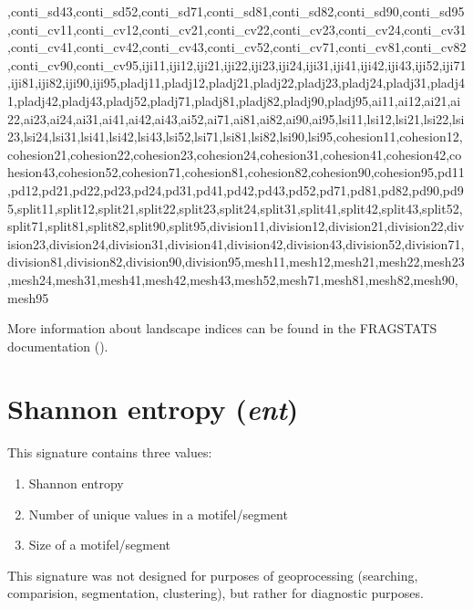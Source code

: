 ,conti_sd43,conti_sd52,conti_sd71,conti_sd81,conti_sd82,conti_sd90,conti_sd95,conti_cv11,conti_cv12,conti_cv21,conti_cv22,conti_cv23,conti_cv24,conti_cv31,conti_cv41,conti_cv42,conti_cv43,conti_cv52,conti_cv71,conti_cv81,conti_cv82,conti_cv90,conti_cv95,iji11,iji12,iji21,iji22,iji23,iji24,iji31,iji41,iji42,iji43,iji52,iji71,iji81,iji82,iji90,iji95,pladj11,pladj12,pladj21,pladj22,pladj23,pladj24,pladj31,pladj41,pladj42,pladj43,pladj52,pladj71,pladj81,pladj82,pladj90,pladj95,ai11,ai12,ai21,ai22,ai23,ai24,ai31,ai41,ai42,ai43,ai52,ai71,ai81,ai82,ai90,ai95,lsi11,lsi12,lsi21,lsi22,lsi23,lsi24,lsi31,lsi41,lsi42,lsi43,lsi52,lsi71,lsi81,lsi82,lsi90,lsi95,cohesion11,cohesion12,cohesion21,cohesion22,cohesion23,cohesion24,cohesion31,cohesion41,cohesion42,cohesion43,cohesion52,cohesion71,cohesion81,cohesion82,cohesion90,cohesion95,pd11,pd12,pd21,pd22,pd23,pd24,pd31,pd41,pd42,pd43,pd52,pd71,pd81,pd82,pd90,pd95,split11,split12,split21,split22,split23,split24,split31,split41,split42,split43,split52,split71,split81,split82,split90,split95,division11,division12,division21,division22,division23,division24,division31,division41,division42,division43,division52,division71,division81,division82,division90,division95,mesh11,mesh12,mesh21,mesh22,mesh23,mesh24,mesh31,mesh41,mesh42,mesh43,mesh52,mesh71,mesh81,mesh82,mesh90,mesh95



More information about landscape indices can be found in the FRAGSTATS documentation (\cite{mcgarigal2014fragstats}).

% 

\section{Shannon entropy ({\it ent})}

This signature contains three values:

\begin{enumerate}
  \item Shannon entropy
  \item Number of unique values in a motifel/segment
  \item Size of a motifel/segment
\end{enumerate}

This signature was not designed for purposes of geoprocessing (searching, comparision, segmentation, clustering), but rather for diagnostic purposes.